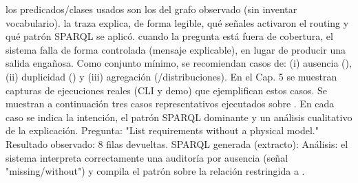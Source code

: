 \markdownRendererUlItem {} los predicados/clases usados son los del grafo observado (sin inventar vocabulario).\markdownRendererUlItemEnd 
\markdownRendererUlItem {} la traza explica, de forma legible, qué señales activaron el routing y qué patrón SPARQL se aplicó.\markdownRendererUlItemEnd 
\markdownRendererUlItem {} cuando la pregunta está fuera de cobertura, el sistema falla de forma controlada (mensaje explicable), en lugar de producir una salida engañosa.\markdownRendererUlItemEnd 
\markdownRendererUlEndTight \markdownRendererInterblockSeparator
{}Como conjunto mínimo, se recomiendan casos de: (i) ausencia (), (ii) duplicidad () y (iii) agregación (/distribuciones). En el Cap. 5 se muestran capturas de ejecuciones reales (CLI y demo) que ejemplifican estos casos.\markdownRendererInterblockSeparator
{}Se muestran a continuación tres casos representativos ejecutados sobre . En cada caso se indica la intención, el patrón SPARQL dominante y un análisis cualitativo de la explicación.\markdownRendererInterblockSeparator
{}\markdownRendererInterblockSeparator
{}Pregunta: "List requirements without a physical model."\markdownRendererInterblockSeparator
{}Resultado observado: 8 filas devueltas.\markdownRendererInterblockSeparator
{}SPARQL generada (extracto):\markdownRendererInterblockSeparator
{}\markdownRendererInterblockSeparator
{}Análisis:\markdownRendererInterblockSeparator
{}\markdownRendererUlBeginTight
\markdownRendererUlItem {} el sistema interpreta correctamente una auditoría por ausencia (señal "missing/without") y compila el patrón  sobre la relación  restringida a .\markdownRendererUlItemEnd 
